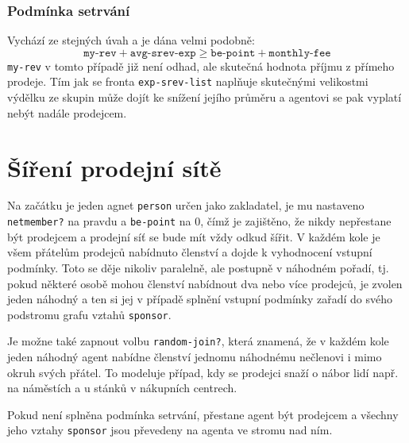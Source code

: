 \documentclass[a4wide,12pt]{report}
\begin{document}
\subsubsection{Podmínka setrvání}
Vychází ze stejných úvah a je dána velmi podobně:
\[ \texttt{my-rev} + \texttt{avg-srev-exp} \geq \texttt{be-point} + \texttt{monthly-fee} \]
\texttt{my-rev} v tomto případě již není odhad, ale skutečná hodnota příjmu z přímeho prodeje. Tím jak se fronta \texttt{exp-srev-list} naplňuje skutečnými velikostmi výdělku ze skupin může dojít ke snížení jejího průměru a agentovi se pak vyplatí nebýt nadále prodejcem.
\section{Šíření prodejní sítě}
\label{sec:spread}
Na začátku je jeden agnet \texttt{person} určen jako zakladatel, je mu nastaveno \texttt{netmember?} na pravdu a \texttt{be-point} na 0, čímž je zajištěno, že nikdy nepřestane být prodejcem a prodejní síť se bude mít vždy odkud šířit. V každém kole je všem přátelům prodejců nabídnuto členství a dojde k vyhodnocení vstupní podmínky. Toto se děje nikoliv paralelně, ale postupně v náhodném pořadí, tj. pokud některé osobě mohou členství nabídnout dva nebo více prodejců, je zvolen jeden náhodný a ten si jej v případě splnění vstupní podmínky zařadí do svého podstromu grafu vztahů \texttt{sponsor}.

Je možne také zapnout volbu \texttt{random-join?}, která znamená, že v každém kole jeden náhodný agent nabídne členství jednomu náhodnému nečlenovi i mimo okruh svých přátel. To modeluje případ, kdy se prodejci snaží o nábor lidí např. na náměstích a u stánků v nákupních centrech.
 
Pokud není splněna podmínka setrvání, přestane agent být prodejcem a všechny jeho vztahy \texttt{sponsor} jsou převedeny na agenta ve stromu nad ním.
\end{document}
